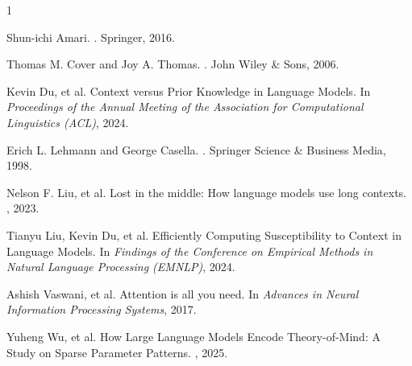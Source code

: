 \documentclass{article}
\theoremstyle{definition}
\begin{document}

\begin{thebibliography}{1}

Shun-ichi Amari.
.
\newblock Springer, 2016.

Thomas M. Cover and Joy A. Thomas.
.
\newblock John Wiley \& Sons, 2006.

Kevin Du, et al.
\newblock Context versus Prior Knowledge in Language Models.
\newblock In {\em Proceedings of the Annual Meeting of the Association for Computational Linguistics (ACL)}, 2024.

Erich L. Lehmann and George Casella.
.
\newblock Springer Science \& Business Media, 1998.

Nelson F. Liu, et al.
\newblock Lost in the middle: How language models use long contexts.
, 2023.

Tianyu Liu, Kevin Du, et al.
\newblock Efficiently Computing Susceptibility to Context in Language Models.
\newblock In {\em Findings of the Conference on Empirical Methods in Natural Language Processing (EMNLP)}, 2024.

Ashish Vaswani, et al.
\newblock Attention is all you need.
\newblock In {\em Advances in Neural Information Processing Systems}, 2017.

Yuheng Wu, et al.
\newblock How Large Language Models Encode Theory-of-Mind: A Study on Sparse Parameter Patterns.
, 2025.

\end{thebibliography}
\end{document}
